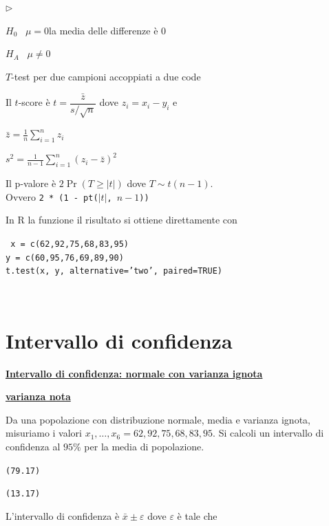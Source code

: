 \documentclass[12pt,openany]{book}
\newcommand{\mylabel}[1]{{\footnotesize\textsf{#1}}\hfill}
\renewenvironment{itemize}
  {\begin{list}{$\triangleright$}{%
   \setlength{\parskip}{0mm}
   \setlength{\topsep}{.2\baselineskip}
   \setlength{\rightmargin}{0mm}
   \setlength{\listparindent}{0mm}
   \setlength{\itemindent}{0mm}
   \setlength{\labelwidth}{3ex}
   \setlength{\itemsep}{.4\baselineskip}
   \setlength{\parsep}{0mm}
   \setlength{\partopsep}{0mm}
   \setlength{\labelsep}{1ex}
   \setlength{\leftmargin}{\labelwidth+\labelsep}
   \let\makelabel\mylabel}}{%
   \end{list}\vspace*{-1.3mm}}
\def\epsilon{\varepsilon}
\theoremstyle{mio}
\theoremstyle{liscio}
\begin{document}
\begin{itemize}
\item[1.] $H_0$ \ $\mu = 0$\hfill la media delle differenze è $0$

\item[2.] $H_A$ \ $\mu\neq0$

\item[3.] $T$-test per due campioni accoppiati a due code

\item[3.] Il $t$-score è 
$t = \dfrac{\bar z}{s/\sqrt{n}}$ dove $z_i=x_i-y_i$ e

$\displaystyle\bar z = \frac1{n}\sum^n_{i=1}z_i$

$\displaystyle s^2= \frac1{n-1}\sum^n_{i=1}(z_i-\bar z)^2$

\item[4.] Il p-valore è $2\Pr(T\ge |t|)$ dove $T\sim t(n-1)$.\\ 
Ovvero {\tt 2 * (1 - pt($|t|$, $n-1$))}

\hrulefill\hfill\hfill

In R la funzione il risultato si ottiene direttamente con

{\tt 
x = c(62,92,75,68,83,95)\\
y = c(60,95,76,69,89,90)\\
t.test(x, y, alternative='two', paired=TRUE)}
\end{itemize}



\hfill{}\clearpage\
\section{Intervallo di confidenza}
\label{ICTesempio1}
\hfill\textbf{{\color{brown}\hyperref[IC_varianza_ignota]{Intervallo di confidenza: normale con varianza ignota \faShare}}}


\hfill\textbf{{\color{brown}\hyperref[IC_varianza_nota]{varianza nota \faShare}}}

Da una popolazione con distribuzione normale, media e varianza ignota, misuriamo i valori $x_1,\dots,x_6=62,92,75,68,83,95$. Si calcoli un intervallo di confidenza al $95\%$ per la media di popolazione.

\hfill {\tt (79.17)}

\hfill {\tt (13.17)}

L'intervallo di confidenza è $\bar x\pm\epsilon$ dove $\epsilon$ è tale che 
\end{document}
